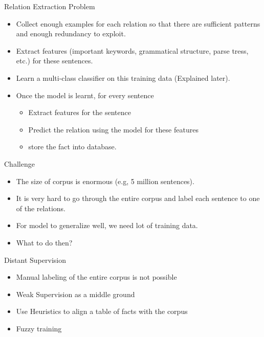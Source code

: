 \documentclass{beamer}
\begin{document}
\begin{frame}{Relation Extraction Problem}
  \begin{itemize}
   \item Collect enough examples for each relation so that there are sufficient patterns and enough redundancy to exploit.
   \item Extract features (important keywords, grammatical structure, parse tress, etc.) for these sentences.
   \item Learn a multi-class classifier on this training data (Explained later).
   \item Once the model is learnt, for every sentence 
    \begin{itemize}
	\item Extract features for the sentence
	\item Predict the relation using the model for these features
	\item store the fact into database.
     \end{itemize}
  \end{itemize}
\end{frame}

\begin{frame}{Challenge}
 \begin{itemize}
  \item The size of corpus is enormous (e.g, 5 million sentences).  \pause
  \item It is very hard to go through the entire corpus and label each sentence to one of the relations. \pause
  \item For model to generalize well, we need lot of training data. \pause
  \item What to do then?
 \end{itemize}
\end{frame}

\begin{frame}{Distant Supervision}
\begin{itemize}
 \item Manual labeling of the entire corpus is not possible
 \item Weak Supervision as a middle ground
  \item Use Heuristics to align a table of facts with the corpus
  \item Fuzzy training 
  
\end{itemize}
\end{frame}
\end{document}
